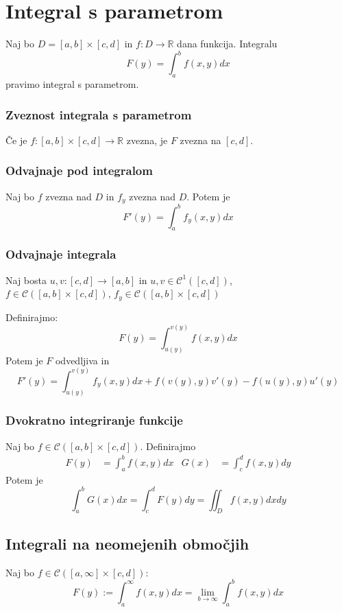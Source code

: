 \documentclass[11pt,a4paper]{article}
\begin{document}
 

\section*{Integral s parametrom}
Naj bo $D = [a,b]\times [c,d]$ in $f: D \to \mathbb{R}$ dana funkcija. Integralu
\[F(y) = \int_a^b f(x,y) dx \]
pravimo integral s parametrom.

\subsubsection*{Zveznost integrala s parametrom}
Če je $f: [a,b]\times [c,d] \to \mathbb{R}$ zvezna, je $F$ zvezna na $[c,d]$.

\subsubsection*{Odvajnaje pod integralom}
Naj bo $f$ zvezna nad $D$ in $f_y$ zvezna nad $D$. Potem je 
\[F'(y) = \int_a^b f_y(x,y) dx \]

\subsubsection*{Odvajnaje integrala}
Naj bosta $u,v: [c,d] \to [a,b]$ in $u,v \in \mathcal{C}^1([c,d])$,\\
$f \in \mathcal{C}([a,b]\times [c,d])$, $f_y \in \mathcal{C}([a,b]\times [c,d])$

Definirajmo: \[F(y) = \int_{u(y)}^{v(y)} f(x,y) dx\]
Potem je $F$ odvedljiva in \[ F'(y) = \int_{u(y)}^{v(y)} f_y(x,y) dx + f\left(v(y),y\right)v'(y) - f\left(u(y),y\right)u'(y)\]

\subsubsection*{Dvokratno integriranje funkcije}
Naj bo $f \in \mathcal{C}([a,b]\times [c,d])$. Definirajmo
\begin{equation*}
    \begin{aligned}
        F(y) &= \int_a^b f(x,y) dx  & G(x) &= \int_c^d f(x,y) dy 
    \end{aligned}
\end{equation*}
Potem je
\[\int_a^b G(x) dx = \int_c^d F(y) dy = \iint_D f(x,y) dxdy\]

\subsection*{Integrali na neomejenih območjih}
Naj bo $f \in \mathcal{C}([a,\infty] \times [c,d])$:
\[F(y) := \int_{a}^{\infty}f(x,y) dx = \lim_{b \to \infty} \int_{a}^{b}f(x,y) dx \]
\end{document}
